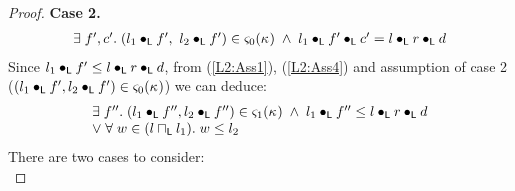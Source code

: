 \begin{lemma}[]
\begin{proof}
%
%
%
%
\noindent\textbf{Case 2.} 
%
\[
\begin{array}{l}
		\exists\; f', c'.\; (l_1 \bullet_{\textsf{L}} f',\ l_2 \bullet_{\textsf{L}} f') \in \varsigma_{0}(\kappa_{}) \;\land\; l_1 \bullet_{\textsf{L}} f' \bullet_{\textsf{L}} c' = l \bullet_{\textsf{L}} r \bullet_{\textsf{L}} d
\end{array}
\]
%
%
Since $l_1 \bullet_{\textsf{L}} f' \leq l \bullet_{\textsf{L}} r \bullet_{\textsf{L}} d$, from (\ref{L2:Ass1}), (\ref{L2:Ass4}) and assumption of case 2 ($(l_1 \bullet_{\textsf{L}} f', l_2  \bullet_{\textsf{L}} f') \in \varsigma_{0}(\kappa_{})$)  we can deduce:
\begin{align}
\begin{array}{l}
	\exists\; f''.\; (l_1 \bullet_{\textsf{L}} f'', l_2 \bullet_{\textsf{L}} f'') \in \varsigma_{1}(\kappa_{}) \;\land\; l_1 \bullet_{\textsf{L}} f'' \leq l \bullet_{\textsf{L}} r \bullet_{\textsf{L}} d\\
	\lor\; \forall\; w \in (l \sqcap_{\textsf{L}} l_1).\; w \leq l_2
\end{array} \nonumber
\end{align}
%
There are two cases to consider:\\


\end{proof}
\end{lemma}
